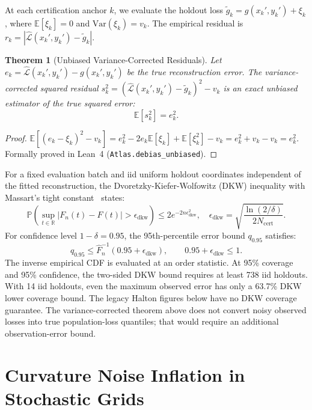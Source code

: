 \documentclass[11pt,a4paper]{article}
\newtheorem{theorem}{Theorem}
\theoremstyle{definition}
\theoremstyle{remark}
\begin{document}
At each certification anchor $k$, we evaluate the holdout loss $\tilde{g}_k = g(x_k', y_k') + \xi_k$, where $\mathbb{E}[\xi_k] = 0$ and $\mathrm{Var}(\xi_k) = v_k$. The empirical residual is $r_k = |\hat{\mathcal{L}}(x_k', y_k') - \tilde{g}_k|$.

\begin{theorem}[Unbiased Variance-Corrected Residuals]\label{thm:debiasing}
Let $e_k = \hat{\mathcal{L}}(x_k', y_k') - g(x_k', y_k')$ be the true reconstruction error. The variance-corrected squared residual $s_k^2 = (\hat{\mathcal{L}}(x_k', y_k') - \tilde{g}_k)^2 - v_k$ is an exact unbiased estimator of the true squared error:
\begin{equation}
    \mathbb{E}[s_k^2] = e_k^2.
\end{equation}
\end{theorem}
\begin{proof}
$\mathbb{E}[(e_k - \xi_k)^2 - v_k] = e_k^2 - 2 e_k \mathbb{E}[\xi_k] + \mathbb{E}[\xi_k^2] - v_k = e_k^2 + v_k - v_k = e_k^2$. Formally proved in Lean~4 (\texttt{Atlas.debias\_unbiased}).
\end{proof}

For a fixed evaluation batch and iid uniform holdout coordinates independent of the fitted reconstruction, the Dvoretzky-Kiefer-Wolfowitz (DKW) inequality with Massart's tight constant~\cite{massart1990tight} states:
\begin{equation}
    \mathbb{P}\left( \sup_{t \in \mathbb{R}} |F_n(t) - F(t)| > \epsilon_{\text{dkw}} \right) \le 2 e^{-2 n \epsilon_{\text{dkw}}^2}, \quad \epsilon_{\text{dkw}} = \sqrt{\frac{\ln(2/\delta)}{2 N_{\text{cert}}}}.
\end{equation}
For confidence level $1 - \delta = 0.95$, the 95th-percentile error bound $q_{0.95}$ satisfies:
\begin{equation}
    q_{0.95} \le \hat{F}_n^{-1}(0.95 + \epsilon_{\text{dkw}}), \qquad 0.95 + \epsilon_{\text{dkw}} \le 1.
\end{equation}
The inverse empirical CDF is evaluated at an order statistic. At 95\% coverage and 95\% confidence, the two-sided DKW bound requires at least 738 iid holdouts. With 14 iid holdouts, even the maximum observed error has only a 63.7\% DKW lower coverage bound. The legacy Halton figures below have no DKW coverage guarantee. The variance-corrected theorem above does not convert noisy observed losses into true population-loss quantiles; that would require an additional observation-error bound.

\section{Curvature Noise Inflation in Stochastic Grids}\label{sec:sharpness_audit}
\end{document}
